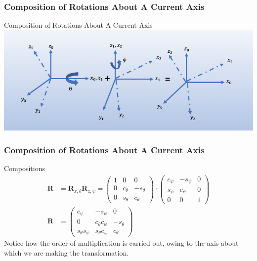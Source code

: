\begin{frame}
	\frametitle{Composition of Rotations About A Current Axis}
	\begin{block}{Composition of Rotations About A Current Axis}
		\centering
		\includegraphics[width=1\textwidth]{../Notes/figures/compoz.jpg}
	\end{block}
\end{frame} 

\begin{frame}
	\frametitle{Composition of Rotations About A Current Axis}
	\begin{block}{Compositions}
		\begin{align}
			\bm{R} &= \bm{R}_{x, \theta} \bm{R}_{z, \psi} 
			= \left(\begin{array}{ccc}
				1 & 0 & 0 \\
				0 & c_\theta & -s_\theta \\
				0 & s_\theta & c_\theta
			\end{array}\right) 
			\cdot
			\left(\begin{array}{ccc}
				c_\psi & -s_\psi & 0 \\
				s_\psi & c_\psi & 0 \\
				0 & 0 & 1
			\end{array}\right) \\
			\bm{R} &= \left(\begin{array}{ccc}
				c_\psi & -s_\psi & 0 \\
				0 & c_\theta c_\psi &  -s_\theta \\
				s_\theta s_\psi & s_\theta c_\psi & c_\theta 
			\end{array}\right)
		\end{align}
		\footnotesize{Notice how the order of multiplication is carried out, owing to the axis about which we are making the transformation.} 
	\end{block}
\end{frame} 

